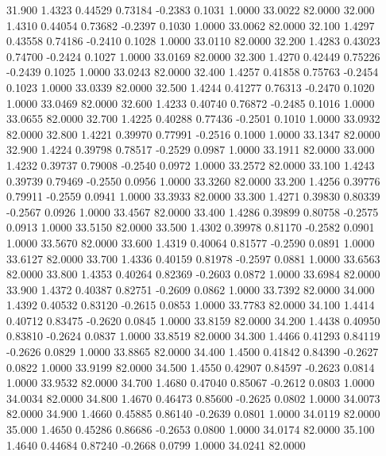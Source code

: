   31.900   1.4323   0.44529   0.73184  -0.2383   0.1031   1.0000  33.0022  82.0000
  32.000   1.4310   0.44054   0.73682  -0.2397   0.1030   1.0000  33.0062  82.0000
  32.100   1.4297   0.43558   0.74186  -0.2410   0.1028   1.0000  33.0110  82.0000
  32.200   1.4283   0.43023   0.74700  -0.2424   0.1027   1.0000  33.0169  82.0000
  32.300   1.4270   0.42449   0.75226  -0.2439   0.1025   1.0000  33.0243  82.0000
  32.400   1.4257   0.41858   0.75763  -0.2454   0.1023   1.0000  33.0339  82.0000
  32.500   1.4244   0.41277   0.76313  -0.2470   0.1020   1.0000  33.0469  82.0000
  32.600   1.4233   0.40740   0.76872  -0.2485   0.1016   1.0000  33.0655  82.0000
  32.700   1.4225   0.40288   0.77436  -0.2501   0.1010   1.0000  33.0932  82.0000
  32.800   1.4221   0.39970   0.77991  -0.2516   0.1000   1.0000  33.1347  82.0000
  32.900   1.4224   0.39798   0.78517  -0.2529   0.0987   1.0000  33.1911  82.0000
  33.000   1.4232   0.39737   0.79008  -0.2540   0.0972   1.0000  33.2572  82.0000
  33.100   1.4243   0.39739   0.79469  -0.2550   0.0956   1.0000  33.3260  82.0000
  33.200   1.4256   0.39776   0.79911  -0.2559   0.0941   1.0000  33.3933  82.0000
  33.300   1.4271   0.39830   0.80339  -0.2567   0.0926   1.0000  33.4567  82.0000
  33.400   1.4286   0.39899   0.80758  -0.2575   0.0913   1.0000  33.5150  82.0000
  33.500   1.4302   0.39978   0.81170  -0.2582   0.0901   1.0000  33.5670  82.0000
  33.600   1.4319   0.40064   0.81577  -0.2590   0.0891   1.0000  33.6127  82.0000
  33.700   1.4336   0.40159   0.81978  -0.2597   0.0881   1.0000  33.6563  82.0000
  33.800   1.4353   0.40264   0.82369  -0.2603   0.0872   1.0000  33.6984  82.0000
  33.900   1.4372   0.40387   0.82751  -0.2609   0.0862   1.0000  33.7392  82.0000
  34.000   1.4392   0.40532   0.83120  -0.2615   0.0853   1.0000  33.7783  82.0000
  34.100   1.4414   0.40712   0.83475  -0.2620   0.0845   1.0000  33.8159  82.0000
  34.200   1.4438   0.40950   0.83810  -0.2624   0.0837   1.0000  33.8519  82.0000
  34.300   1.4466   0.41293   0.84119  -0.2626   0.0829   1.0000  33.8865  82.0000
  34.400   1.4500   0.41842   0.84390  -0.2627   0.0822   1.0000  33.9199  82.0000
  34.500   1.4550   0.42907   0.84597  -0.2623   0.0814   1.0000  33.9532  82.0000
  34.700   1.4680   0.47040   0.85067  -0.2612   0.0803   1.0000  34.0034  82.0000
  34.800   1.4670   0.46473   0.85600  -0.2625   0.0802   1.0000  34.0073  82.0000
  34.900   1.4660   0.45885   0.86140  -0.2639   0.0801   1.0000  34.0119  82.0000
  35.000   1.4650   0.45286   0.86686  -0.2653   0.0800   1.0000  34.0174  82.0000
  35.100   1.4640   0.44684   0.87240  -0.2668   0.0799   1.0000  34.0241  82.0000
